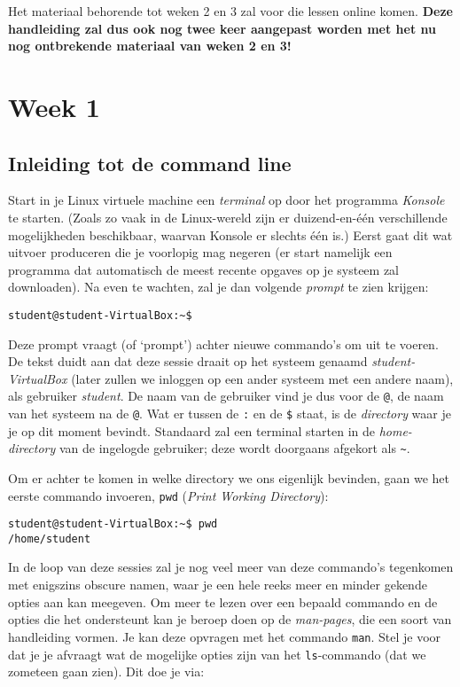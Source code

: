 \documentclass[a4paper,twoside,openany]{memoir}
\begin{document}
Het materiaal behorende tot weken 2 en 3 zal voor die lessen online komen.
\textbf{Deze handleiding zal dus ook nog twee keer aangepast worden met het nu
nog ontbrekende materiaal van weken 2 en 3!}

\part{Week 1}
\chapter{Inleiding tot de command line}

Start in je Linux virtuele machine een \emph{terminal} op door het programma
\emph{Konsole} te starten. (Zoals zo vaak in de Linux-wereld zijn er
duizend-en-één verschillende mogelijkheden beschikbaar, waarvan Konsole er
slechts één is.) Eerst gaat dit wat uitvoer produceren die je voorlopig mag
negeren (er start namelijk een programma dat automatisch de meest recente
opgaves op je systeem zal downloaden). Na even te wachten, zal je dan volgende
\emph{prompt} te zien krijgen:

\begin{verbatim}
student@student-VirtualBox:~$ 
\end{verbatim}

Deze prompt vraagt (of `prompt') achter nieuwe commando's om uit te voeren. De
tekst duidt aan dat deze sessie draait op het systeem genaamd
\emph{student-VirtualBox} (later zullen we inloggen op een ander systeem met een
andere naam), als gebruiker \emph{student}. De naam van de gebruiker vind je dus
voor de \texttt{@}, de naam van het systeem na de \texttt{@}. Wat er tussen de
\texttt{:} en de \texttt{\$} staat, is de \emph{directory} waar je je op dit
moment bevindt. Standaard zal een terminal starten in de \emph{home-directory}
van de ingelogde gebruiker; deze wordt doorgaans afgekort als \texttt{\~}.

Om er achter te komen in welke directory we ons eigenlijk bevinden, gaan we het
eerste commando invoeren, \verb!pwd! (\emph{Print Working Directory}):

\begin{verbatim}
student@student-VirtualBox:~$ pwd
/home/student
\end{verbatim}

In de loop van deze sessies zal je nog veel meer van deze commando's tegenkomen
met enigszins obscure namen, waar je een hele reeks meer en minder gekende
opties aan kan meegeven. Om meer te lezen over een bepaald commando en de opties
die het ondersteunt kan je beroep doen op de \emph{man-pages}, die een soort van
handleiding vormen. Je kan deze opvragen met het commando \verb!man!. Stel je
voor dat je je afvraagt wat de mogelijke opties zijn van het \verb!ls!-commando
(dat we zometeen gaan zien). Dit doe je via:
\end{document}

